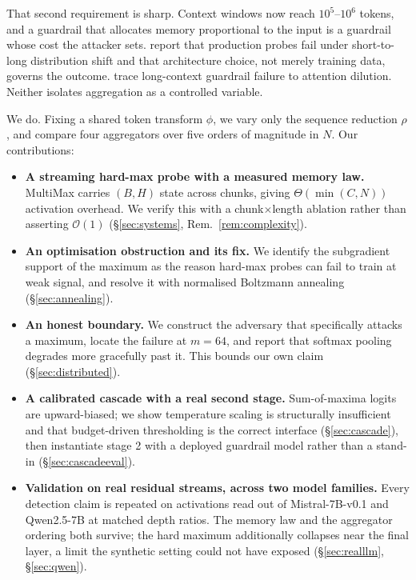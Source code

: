 \documentclass[10pt]{article}
\theoremstyle{plain}
\theoremstyle{definition}
\theoremstyle{remark}
\begin{document}
That second requirement is sharp. Context windows now reach $10^5$--$10^6$ tokens, and a
guardrail that allocates memory proportional to the input is a guardrail whose cost the
attacker sets. \citet{kramar2026gemini} report that production probes fail under
short-to-long distribution shift and that architecture choice, not merely training data,
governs the outcome. \citet{chen2026longguard} trace long-context guardrail failure to
attention dilution. Neither isolates aggregation as a controlled variable.

We do. Fixing a shared token transform $\phi$, we vary only the sequence reduction
$\rho$, and compare four aggregators over five orders of magnitude in $N$. Our
contributions:

\begin{itemize}\itemsep2pt
  \item \textbf{A streaming hard-max probe with a measured memory law.} MultiMax carries
  $(B,H)$ state across chunks, giving $\Theta(\min(C,N))$ activation overhead. We verify
  this with a chunk$\times$length ablation rather than asserting $\mathcal{O}(1)$
  (\S\ref{sec:systems}, Rem.~\ref{rem:complexity}).
  \item \textbf{An optimisation obstruction and its fix.} We identify the subgradient
  support of the maximum as the reason hard-max probes can fail to train at weak signal,
  and resolve it with normalised Boltzmann annealing (\S\ref{sec:annealing}).
  \item \textbf{An honest boundary.} We construct the adversary that specifically attacks
  a maximum, locate the failure at $m{=}64$, and report that softmax pooling degrades more
  gracefully past it. This bounds our own claim (\S\ref{sec:distributed}).
  \item \textbf{A calibrated cascade with a real second stage.} Sum-of-maxima logits are
  upward-biased; we show temperature scaling is structurally insufficient and that
  budget-driven thresholding is the correct interface (\S\ref{sec:cascade}), then
  instantiate stage 2 with a deployed guardrail model rather than a stand-in
  (\S\ref{sec:cascadeeval}).
  \item \textbf{Validation on real residual streams, across two model families.} Every
  detection claim is repeated on activations read out of Mistral-7B-v0.1 and
  Qwen2.5-7B at matched depth ratios. The memory law and the aggregator ordering both
  survive; the hard maximum additionally collapses near the final layer, a limit the
  synthetic setting could not have exposed (\S\ref{sec:realllm}, \S\ref{sec:qwen}).

\end{itemize}
\end{document}
